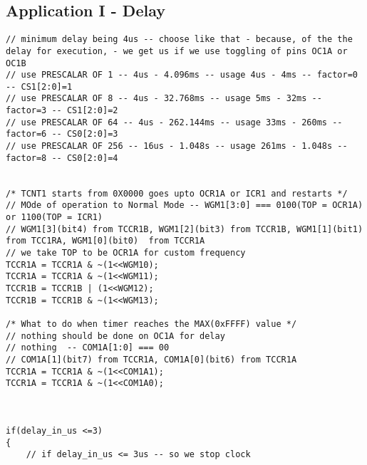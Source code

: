 \documentclass{article}
\begin{document}
\subsection{Application I - Delay}
\begin{verbatim}
// minimum delay being 4us -- choose like that - because, of the the delay for execution, - we get us if we use toggling of pins OC1A or OC1B
// use PRESCALAR OF 1 -- 4us - 4.096ms -- usage 4us - 4ms -- factor=0 -- CS1[2:0]=1
// use PRESCALAR OF 8 -- 4us - 32.768ms -- usage 5ms - 32ms -- factor=3 -- CS1[2:0]=2
// use PRESCALAR OF 64 -- 4us - 262.144ms -- usage 33ms - 260ms -- factor=6 -- CS0[2:0]=3
// use PRESCALAR OF 256 -- 16us - 1.048s -- usage 261ms - 1.048s -- factor=8 -- CS0[2:0]=4


/* TCNT1 starts from 0X0000 goes upto OCR1A or ICR1 and restarts */	
// MOde of operation to Normal Mode -- WGM1[3:0] === 0100(TOP = OCR1A) or 1100(TOP = ICR1)
// WGM1[3](bit4) from TCCR1B, WGM1[2](bit3) from TCCR1B, WGM1[1](bit1)  from TCC1RA, WGM1[0](bit0)  from TCCR1A	
// we take TOP to be OCR1A for custom frequency
TCCR1A = TCCR1A & ~(1<<WGM10);
TCCR1A = TCCR1A & ~(1<<WGM11);
TCCR1B = TCCR1B | (1<<WGM12);
TCCR1B = TCCR1B & ~(1<<WGM13);
    
/* What to do when timer reaches the MAX(0xFFFF) value */
// nothing should be done on OC1A for delay
// nothing  -- COM1A[1:0] === 00
// COM1A[1](bit7) from TCCR1A, COM1A[0](bit6) from TCCR1A
TCCR1A = TCCR1A & ~(1<<COM1A1);
TCCR1A = TCCR1A & ~(1<<COM1A0);



if(delay_in_us <=3)
{
    // if delay_in_us <= 3us -- so we stop clock
    

\end{verbatim}
\end{document}

